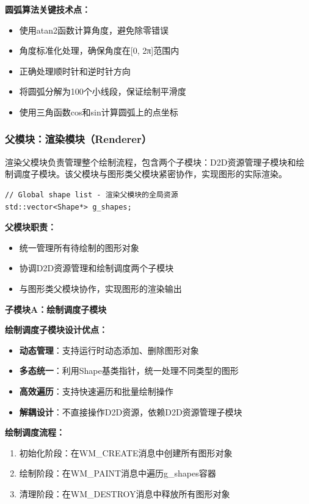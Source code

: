 \documentclass[12pt,a4paper]{article}
\begin{document}
\textbf{圆弧算法关键技术点：}
\begin{itemize}
    \item 使用atan2函数计算角度，避免除零错误
    \item 角度标准化处理，确保角度在[0, 2π]范围内
    \item 正确处理顺时针和逆时针方向
    \item 将圆弧分解为100个小线段，保证绘制平滑度
    \item 使用三角函数cos和sin计算圆弧上的点坐标
\end{itemize}

\subsubsection{父模块：渲染模块（Renderer）}

渲染父模块负责管理整个绘制流程，包含两个子模块：D2D资源管理子模块和绘制调度子模块。该父模块与图形类父模块紧密协作，实现图形的实际渲染。

\begin{lstlisting}[caption=渲染父模块全局资源]
// Global shape list - 渲染父模块的全局资源
std::vector<Shape*> g_shapes;
\end{lstlisting}

\textbf{父模块职责：}
\begin{itemize}
    \item 统一管理所有待绘制的图形对象
    \item 协调D2D资源管理和绘制调度两个子模块
    \item 与图形类父模块协作，实现图形的渲染输出
\end{itemize}

\textbf{子模块A：绘制调度子模块}

\textbf{绘制调度子模块设计优点：}
\begin{itemize}
    \item \textbf{动态管理}：支持运行时动态添加、删除图形对象
    \item \textbf{多态统一}：利用Shape基类指针，统一处理不同类型的图形
    \item \textbf{高效遍历}：支持快速遍历和批量绘制操作
    \item \textbf{解耦设计}：不直接操作D2D资源，依赖D2D资源管理子模块
\end{itemize}

\textbf{绘制调度流程：}
\begin{enumerate}
    \item 初始化阶段：在WM\_CREATE消息中创建所有图形对象
    \item 绘制阶段：在WM\_PAINT消息中遍历g\_shapes容器
    \item 清理阶段：在WM\_DESTROY消息中释放所有图形对象
\end{enumerate}
\end{document}
